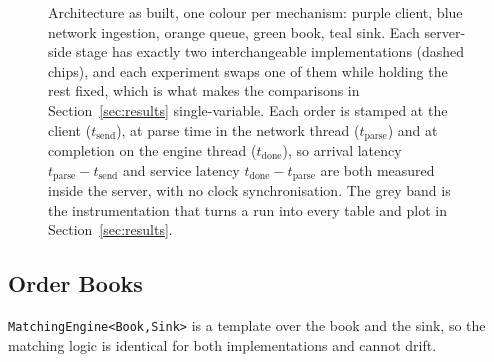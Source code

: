 \documentclass[conference]{IEEEtran}
\begin{document}
\begin{figure}[!t]
\caption{Architecture as built, one colour per mechanism: purple client, blue
network ingestion, orange queue, green book, teal sink. Each server-side stage
has exactly two interchangeable implementations (dashed chips), and each
experiment swaps one of them while holding the rest fixed, which is what makes
the comparisons in Section~\ref{sec:results} single-variable. Each order is
stamped at the client ($t_{\text{send}}$), at parse time in the network thread
($t_{\text{parse}}$) and at completion on the engine thread
($t_{\text{done}}$), so arrival latency $t_{\text{parse}}-t_{\text{send}}$ and
service latency $t_{\text{done}}-t_{\text{parse}}$ are both measured inside the
server, with no clock synchronisation. The grey band is the instrumentation
that turns a run into every table and plot in Section~\ref{sec:results}.}
\label{fig:arch}
\end{figure}

\subsection{Order Books}
\texttt{MatchingEngine<Book,Sink>} is a template over the book and the sink, so
the matching logic is identical for both implementations and cannot drift.
\end{document}
